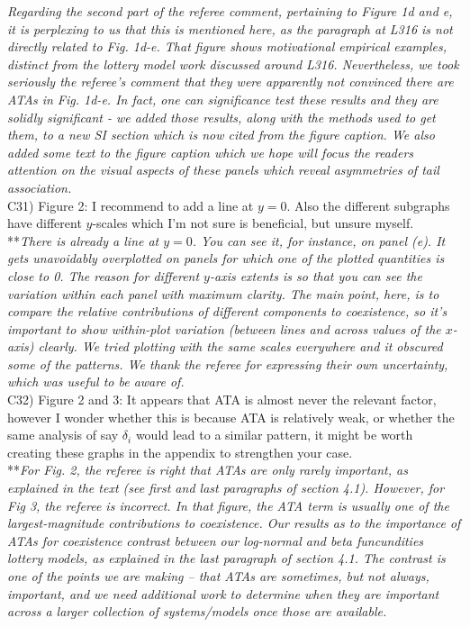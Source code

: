 \documentclass[letterpaper,11pt]{article}
\begin{document}
\emph{Regarding the second part of the referee comment, pertaining to Figure 1d and e, it is perplexing to us that 
this is mentioned here,
as the paragraph at L316 is not directly related to Fig. 1d-e. That figure
shows motivational empirical examples, distinct from the lottery model work discussed around L316. Nevertheless, we took
seriously the referee's comment that they were apparently not convinced there are ATAs in Fig. 1d-e.
In fact, one can significance test these results and they are solidly significant - we added
those results, along with the methods used to get them, to a new SI section which is now cited from the
figure caption. We also added some text to the figure caption which we hope will focus the 
readers attention on the visual aspects of these panels which reveal asymmetries of tail association. } \\

\noindent C31) Figure 2: I recommend to add a line at $y = 0$. Also the different subgraphs have different $y$-scales which I’m not sure is beneficial, but unsure myself. \\

\noindent ***\emph{There is already a line at $y=0$. You can see it, for instance, on panel (e). 
It gets unavoidably overplotted on panels for which one of the plotted quantities is close to 0. The reason
for different $y$-axis extents is so that you can see the variation within each panel with maximum 
clarity. The main point, here, is to compare the relative contributions of different components
to coexistence, so it's important to show within-plot variation (between lines and across 
values of the $x$-axis) clearly. We tried plotting with the same scales everywhere and it obscured some of the 
patterns. We thank the referee for expressing their own uncertainty, which was
useful to be aware of.} \\

\noindent C32) Figure 2 and 3: It appears that ATA is almost never the relevant factor, however I wonder whether this is because ATA is relatively weak, or whether the same analysis of say $\delta_i$ would lead to a similar pattern, it might be worth creating these graphs in the appendix to strengthen your case. \\

\noindent ***\emph{For Fig. 2, the referee is right that ATAs are only rarely important, as explained in the text 
(see first and last paragraphs of section 4.1). However, for Fig 3, the referee is incorrect. In that figure, the ATA term
is usually one of the largest-magnitude contributions to coexistence. Our results as to the importance of ATAs for coexistence 
contrast between our log-normal and beta funcundities lottery models, as explained in the last paragraph
of section 4.1. The contrast is one of the points we are making -- that ATAs are sometimes, but not always, important,
and we need additional work to determine when they are important across a larger collection of systems/models once
those are available.} \\
\end{document}
